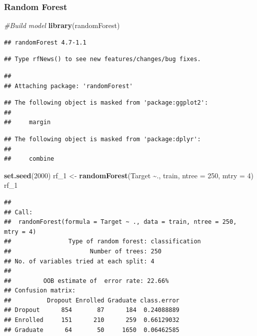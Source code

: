 \documentclass[
]{article}
\newenvironment{Shaded}{\begin{snugshade}}{\end{snugshade}}
\newcommand{\AttributeTok}[1]{\textcolor[rgb]{0.13,0.29,0.53}{#1}}
\newcommand{\CommentTok}[1]{\textcolor[rgb]{0.56,0.35,0.01}{\textit{#1}}}
\newcommand{\DecValTok}[1]{\textcolor[rgb]{0.00,0.00,0.81}{#1}}
\newcommand{\FunctionTok}[1]{\textcolor[rgb]{0.13,0.29,0.53}{\textbf{#1}}}
\newcommand{\NormalTok}[1]{#1}
\newcommand{\OtherTok}[1]{\textcolor[rgb]{0.56,0.35,0.01}{#1}}
\newcommand{\SpecialCharTok}[1]{\textcolor[rgb]{0.81,0.36,0.00}{\textbf{#1}}}
\begin{document}
\hypertarget{random-forest}{%
\subsubsection{Random Forest}\label{random-forest}}

\begin{Shaded}
\begin{Highlighting}[]
\CommentTok{\#Build model}
\FunctionTok{library}\NormalTok{(randomForest)}
\end{Highlighting}
\end{Shaded}

\begin{verbatim}
## randomForest 4.7-1.1
\end{verbatim}

\begin{verbatim}
## Type rfNews() to see new features/changes/bug fixes.
\end{verbatim}

\begin{verbatim}
## 
## Attaching package: 'randomForest'
\end{verbatim}

\begin{verbatim}
## The following object is masked from 'package:ggplot2':
## 
##     margin
\end{verbatim}

\begin{verbatim}
## The following object is masked from 'package:dplyr':
## 
##     combine
\end{verbatim}

\begin{Shaded}
\begin{Highlighting}[]
\FunctionTok{set.seed}\NormalTok{(}\DecValTok{2000}\NormalTok{)}
\NormalTok{rf\_1 }\OtherTok{\textless{}{-}} \FunctionTok{randomForest}\NormalTok{(Target }\SpecialCharTok{\textasciitilde{}}\NormalTok{., train, }\AttributeTok{ntree =} \DecValTok{250}\NormalTok{, }\AttributeTok{mtry =} \DecValTok{4}\NormalTok{)}
\NormalTok{rf\_1}
\end{Highlighting}
\end{Shaded}

\begin{verbatim}
## 
## Call:
##  randomForest(formula = Target ~ ., data = train, ntree = 250,      mtry = 4) 
##                Type of random forest: classification
##                      Number of trees: 250
## No. of variables tried at each split: 4
## 
##         OOB estimate of  error rate: 22.66%
## Confusion matrix:
##          Dropout Enrolled Graduate class.error
## Dropout      854       87      184  0.24088889
## Enrolled     151      210      259  0.66129032
## Graduate      64       50     1650  0.06462585
\end{verbatim}
\end{document}
